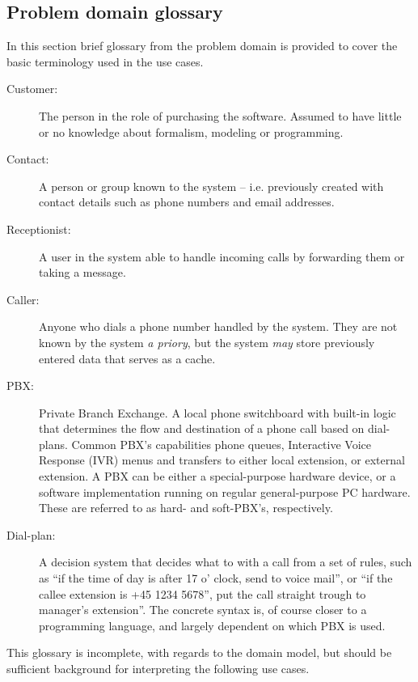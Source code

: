 \subsection{Problem domain glossary}
In this section brief glossary from the problem domain is provided to cover the basic terminology used in the use cases.
\begin{description}
  \item[Customer:] The person in the role of purchasing the software. Assumed to have little or no knowledge about formalism, modeling or programming.
  \item[Contact:] A person or group known to the system -- i.e. previously created with contact details such as phone numbers and email addresses.
  \item[Receptionist:] A user in the system able to handle incoming calls by forwarding them or taking a message.
  \item[Caller:] Anyone who dials a phone number handled by the system. They are not known by the system \textit{a priory}, but the system \textit{may} store previously entered data that serves as a cache.
  \item[PBX:] Private Branch Exchange. A local phone switchboard with built-in logic that determines the flow and destination of a phone call based on dial-plans. Common PBX's capabilities phone queues, Interactive Voice Response (IVR) menus and transfers to either local extension, or external extension. A PBX can be either a special-purpose hardware device, or a software implementation running on regular general-purpose PC hardware. These are referred to as hard- and soft-PBX's, respectively.
  \item[Dial-plan:] A decision system that decides what to with a call from a set of rules, such as ``if the time of day is after 17 o' clock, send to voice mail'', or ``if the callee extension is +45 1234 5678'', put the call straight trough to manager's extension''. The concrete syntax is, of course closer to a programming language, and largely dependent on which PBX is used.

\end{description}
This glossary is incomplete, with regards to the domain model, but should be sufficient background for interpreting the following use cases.
